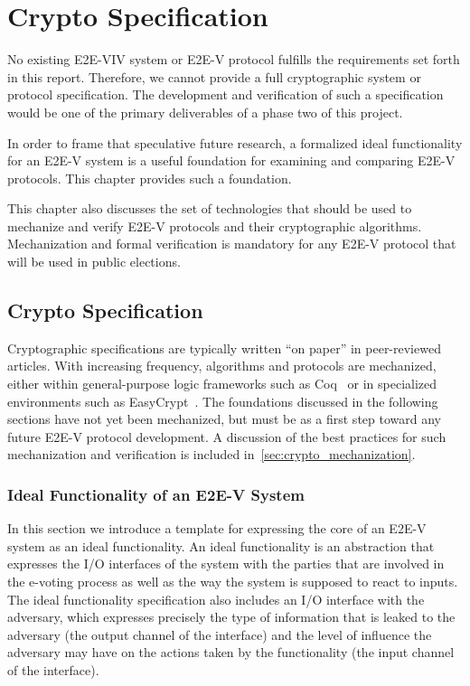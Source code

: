 \chapter{Crypto Specification}
\label{chapter:crypto_spec}

No existing E2E-VIV system or E2E-V protocol fulfills the requirements
set forth in this report. Therefore, we cannot provide a full
cryptographic system or protocol specification.  The development and
verification of such a specification would be one of the primary
deliverables of a phase two of this project.

In order to frame that speculative future research, a formalized ideal
functionality for an E2E-V system is a useful foundation for examining
and comparing E2E-V protocols. This chapter provides such a foundation.

This chapter also discusses the set of technologies that should be
used to mechanize and verify E2E-V protocols and their cryptographic
algorithms. Mechanization and formal verification is mandatory for any
E2E-V protocol that will be used in public elections.

\section{Crypto Specification}

Cryptographic specifications are typically written ``on paper'' in
peer-reviewed articles. With increasing frequency, algorithms and
protocols are mechanized, either within general-purpose logic
frameworks such as Coq~\cite{Coq} or in specialized environments such
as EasyCrypt~\cite{EasyCrypt}. The foundations discussed in the
following sections have not yet been mechanized, but must be as a
first step toward any future E2E-V protocol development. A discussion of
the best practices for such mechanization and verification is included
in~\autoref{sec:crypto_mechanization}.

\subsection{Ideal Functionality of an E2E-V System}

In this section we introduce a template for expressing the core of an
E2E-V system as an ideal functionality. An ideal
functionality is an abstraction that expresses the I/O interfaces of
the system with the parties that are involved in the e-voting process
as well as the way the system is supposed to react to inputs. The
ideal functionality specification also includes an I/O interface with
the adversary, which expresses precisely the type of information that
is leaked to the adversary (the output channel of the interface) and
the level of influence the adversary may have on the actions taken by
the functionality (the input channel of the interface).

